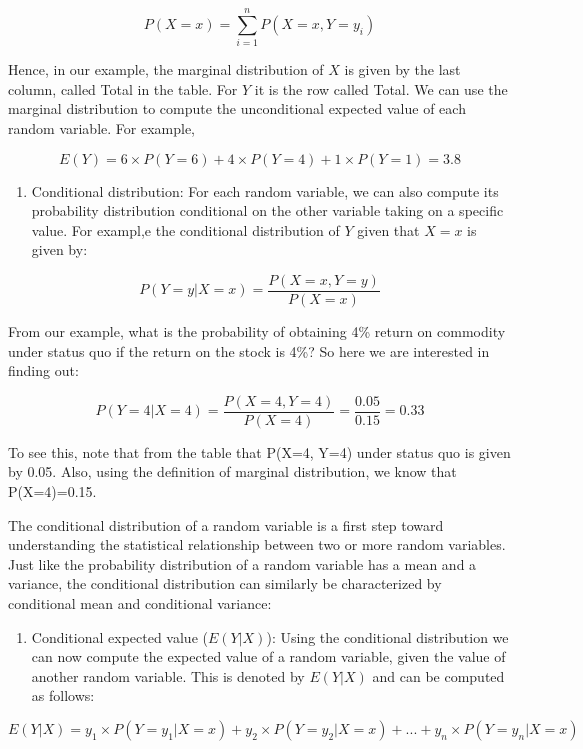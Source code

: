 \documentclass[]{book}
\providecommand{\tightlist}{%
  \setlength{\itemsep}{0pt}\setlength{\parskip}{0pt}}
\theoremstyle{definition}
\theoremstyle{definition}
\theoremstyle{definition}
\theoremstyle{remark}
\begin{document}
\[P(X=x)=\sum_{i=1}^nP(X=x, Y=y_i)\]

Hence, in our example, the marginal distribution of \(X\) is given by the last column, called Total in the table. For \(Y\) it is the row called Total. We can use the marginal distribution to compute the unconditional expected value of each random variable. For example,

\[E(Y) = 6 \times P(Y=6) + 4 \times P(Y=4)+1 \times P(Y=1)=3.8\]

\begin{enumerate}
\def\labelenumi{\arabic{enumi}.}
\setcounter{enumi}{1}
\tightlist
\item
  Conditional distribution: For each random variable, we can also compute its probability distribution conditional on the other variable taking on a specific value. For exampl,e the conditional distribution of \(Y\) given that \(X=x\) is given by:
\end{enumerate}

\[ P(Y=y|X=x) =\frac{P(X=x,Y=y)}{P(X=x)}\]

From our example, what is the probability of obtaining 4\% return on commodity under status quo if the return on the stock is 4\%? So here we are interested in finding out:

\[ P(Y=4|X=4) =\frac{P(X=4,Y=4)}{P(X=4)}= \frac{0.05}{0.15}=0.33\]

To see this, note that from the table that P(X=4, Y=4) under status quo is given by 0.05. Also, using the definition of marginal distribution, we know that P(X=4)=0.15.

The conditional distribution of a random variable is a first step toward understanding the statistical relationship between two or more random variables. Just like the probability distribution of a random variable has a mean and a variance, the conditional distribution can similarly be characterized by conditional mean and conditional variance:

\begin{enumerate}
\def\labelenumi{\arabic{enumi}.}
\tightlist
\item
  Conditional expected value (\(E(Y|X)\)): Using the conditional distribution we can now compute the expected value of a random variable, given the value of another random variable. This is denoted by \(E(Y|X)\) and can be computed as follows:
\end{enumerate}

\[E(Y|X)=y_1 \times P(Y=y_1|X=x) + y_2 \times P(Y=y_2|X=x)+...+ y_n \times P(Y=y_n|X=x)\]
\end{document}
